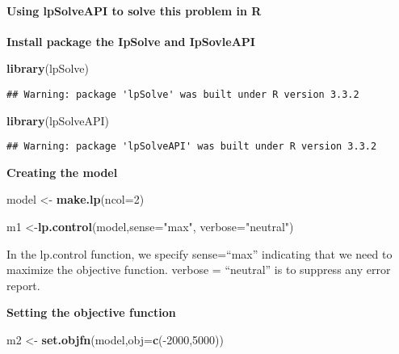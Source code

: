 \documentclass[]{article}
\newenvironment{Shaded}{\begin{snugshade}}{\end{snugshade}}
\newcommand{\KeywordTok}[1]{\textcolor[rgb]{0.13,0.29,0.53}{\textbf{{#1}}}}
\newcommand{\DataTypeTok}[1]{\textcolor[rgb]{0.13,0.29,0.53}{{#1}}}
\newcommand{\DecValTok}[1]{\textcolor[rgb]{0.00,0.00,0.81}{{#1}}}
\newcommand{\StringTok}[1]{\textcolor[rgb]{0.31,0.60,0.02}{{#1}}}
\newcommand{\NormalTok}[1]{{#1}}
\let\oldparagraph\paragraph
\renewcommand{\paragraph}[1]{\oldparagraph{#1}\mbox{}}
\begin{document}
\paragraph{Using lpSolveAPI to solve this problem in
R}\label{using-lpsolveapi-to-solve-this-problem-in-r}

\textbf{Install package the IpSolve and IpSovleAPI}

\begin{Shaded}
\begin{Highlighting}[]
\KeywordTok{library}\NormalTok{(lpSolve)}
\end{Highlighting}
\end{Shaded}

\begin{verbatim}
## Warning: package 'lpSolve' was built under R version 3.3.2
\end{verbatim}

\begin{Shaded}
\begin{Highlighting}[]
\KeywordTok{library}\NormalTok{(lpSolveAPI)}
\end{Highlighting}
\end{Shaded}

\begin{verbatim}
## Warning: package 'lpSolveAPI' was built under R version 3.3.2
\end{verbatim}

\textbf{Creating the model}

\begin{Shaded}
\begin{Highlighting}[]
\NormalTok{model <-}\StringTok{ }\KeywordTok{make.lp}\NormalTok{(}\DataTypeTok{ncol=}\DecValTok{2}\NormalTok{)}

\NormalTok{m1 <-}\KeywordTok{lp.control}\NormalTok{(model,}\DataTypeTok{sense=}\StringTok{"max"}\NormalTok{, }\DataTypeTok{verbose=}\StringTok{"neutral"}\NormalTok{)}
\end{Highlighting}
\end{Shaded}

In the lp.control function, we specify sense=``max'' indicating that we
need to maximize the objective function. verbose = ``neutral'' is to
suppress any error report.

\textbf{Setting the objective function}

\begin{Shaded}
\begin{Highlighting}[]
\NormalTok{m2 <-}\StringTok{ }\KeywordTok{set.objfn}\NormalTok{(model,}\DataTypeTok{obj=}\KeywordTok{c}\NormalTok{(-}\DecValTok{2000}\NormalTok{,}\DecValTok{5000}\NormalTok{))}
\end{Highlighting}
\end{Shaded}
\end{document}
